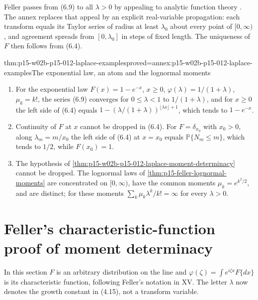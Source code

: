 Feller passes from (6.9) to all \(\lambda>0\) by appealing to analytic function
theory \cite[vol.~II, VII.6, p.~234]{Feller1971ProbabilityII}. The annex
replaces that appeal by an explicit real-variable propagation: each transform
equals its Taylor series of radius at least \(\lambda_0\) about every point of
\([0,\infty)\), and agreement spreads from \([0,\lambda_0]\) in steps of fixed
length. The uniqueness of \(F\) then follows from (6.4).

\begin{hbtheorem}{thm:p15-w02b-p15-012-laplace-examples}{proved=annex:p15-w02b-p15-012-laplace-examples}{The exponential law, an atom and the lognormal moments}
\begin{enumerate}
\item For the exponential law \(F(x)=1-e^{-x}\), \(x\geq0\),
      \(\varphi(\lambda)=1/(1+\lambda)\), \(\mu_k=k!\), the series (6.9)
      converges for \(0\leq\lambda<1\) to \(1/(1+\lambda)\), and for
      \(x\geq0\) the left side of (6.4) equals
      \(1-(\lambda/(1+\lambda))^{\lfloor\lambda x\rfloor+1}\), which tends to
      \(1-e^{-x}\).
\item Continuity of \(F\) at \(x\) cannot be dropped in (6.4). For
      \(F=\delta_{x_0}\) with \(x_0>0\), along \(\lambda_m=m/x_0\) the left
      side of (6.4) at \(x=x_0\) equals \(\mathbb P\{N_m\leq m\}\), which
      tends to \(1/2\), while \(F(x_0)=1\).
\item The hypothesis of \cref{thm:p15-w02b-p15-012-laplace-moment-determinacy}
      cannot be dropped. The lognormal laws of
      \cref{thm:p15-feller-lognormal-moments} are concentrated on
      \([0,\infty)\), have the common moments \(\mu_k=e^{k^2/2}\), and are
      distinct; for these moments \(\sum_k\mu_k\lambda^k/k!=\infty\) for
      every \(\lambda>0\).
\end{enumerate}
\end{hbtheorem}

\section{Feller's characteristic-function proof of moment determinacy}
\label{sec:p15-w02b-p15-012-xv4}

In this section \(F\) is an arbitrary distribution on the line and
\(\varphi(\zeta)=\int e^{i\zeta x}F\{dx\}\) is its characteristic function,
following Feller's notation in XV. The letter \(\lambda\) now denotes the
growth constant in (4.15), not a transform variable.

